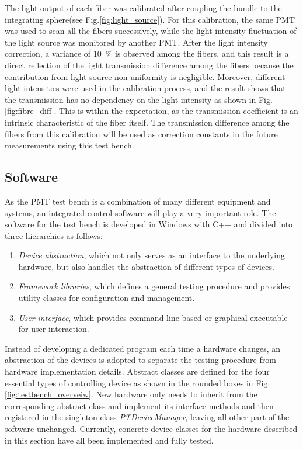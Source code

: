 \documentclass[5p, times]{elsarticle}
\begin{document}
The light output of each fiber was calibrated after coupling the bundle to the integrating sphere(see Fig.\ref{fig:light_source}).
For this calibration, the same PMT was used to scan all the fibers successively, while the light intensity fluctuation of the light source was monitored by another PMT.
After the light intensity correction, a variance of \SI{10}{\percent} is observed among the fibers, and this result is a direct reflection of the light transmission difference among the fibers because the contribution from light source non-uniformity is negligible.
Moreover, different light intensities were used in the calibration process, and the result shows that the transmission has no dependency on the light intensity as shown in Fig.\ref{fig:fibre_diff}. 
This is within the expectation, as the transmission coefficient is an intrinsic characteristic of the fiber itself.
The transmission difference among the fibers from this calibration will be used as correction constants in the future measurements using this test bench.

\subsection{Software}
\label{sec:software}

As the PMT test bench is a combination of many different equipment and systems, an integrated control software will play a very important role. The software for the test bench is developed in Windows with C++ and divided into three hierarchies as follows:
\begin{enumerate}
 \item \textit{Device abstraction}, which not only serves as an interface to the underlying hardware, but also handles the abstraction of different types of devices. 
 \item \textit{Framework libraries}, which defines a general testing procedure and provides utility classes for configuration and management.
 \item \textit{User interface}, which provides command line based or graphical executable for user interaction. 
\end{enumerate}

Instead of developing a dedicated program each time a hardware changes, an abstraction of the devices is adopted to separate the testing procedure from hardware implementation details. 
Abstract classes are defined for the four essential types of controlling device as shown in the rounded boxes in Fig.\ref{fig:testbench_overveiw}.
New hardware only needs to inherit from the corresponding abstract class and implement its interface methods and then registered in the singleton class \textit{PTDeviceManager}, leaving all other part of the software unchanged.
Currently, concrete device classes for the hardware described in this section have all been implemented and fully tested.
\end{document}
